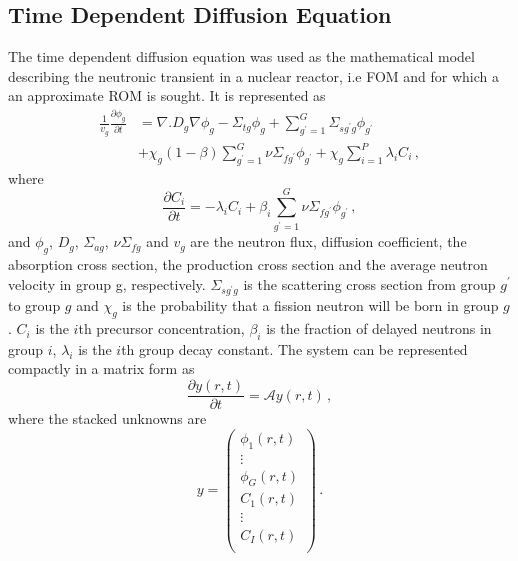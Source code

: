 \documentclass[]{interact}
\theoremstyle{plain}%
\theoremstyle{definition}
\theoremstyle{remark}
\begin{document}
\subsection{Time Dependent Diffusion Equation}
\label{sec:fom}
The time dependent diffusion equation was used as the mathematical model describing the neutronic transient in a nuclear reactor, i.e FOM and for which a an approximate ROM is sought.
It is represented as
\begin{equation}
	\begin{split}
	\frac{1}{v_g} \frac{\partial\phi_g}{\partial t} &= 
	\nabla. D_g\nabla\phi_g - \Sigma_{tg}\phi_g + \sum_{g^\prime=1}^{G}{\Sigma_{sg^\prime g}}\phi_{g^\prime} \\
	&+ \chi_g(1-\beta)\sum_{g^\prime = 1}^{G}\nu\Sigma_{fg^\prime}\phi_{g^\prime}  
	+ \chi_g\sum_{i=1}^{P} \lambda_i C_i \, ,
	\end{split}
	\label{time_diff}
\end{equation}
where 
\begin{equation*}
	\frac{\partial C_i}{\partial t} = -\lambda_i C_i + \beta_i \sum_{g^\prime=1}^{G} \nu\Sigma_{fg^\prime} \phi_{g^\prime} \, ,
\end{equation*}
and $\phi_g$, $D_g$, $\Sigma_{ag}$, $\nu\Sigma_{fg}$ and $v_g$ are the neutron flux, diffusion coefficient, the absorption cross section, the production cross section and the average neutron velocity in group g, respectively. $\Sigma_{sg^\prime g}$ is the scattering cross section from group $g^\prime$ to group $g$ 
and $\chi_g$ is the probability that a fission neutron will be born in group $g$.
$C_i$ is the $i$th precursor concentration, $\beta_i$ is the fraction of delayed neutrons in group $i$, $\lambda_i$ is the $i$th group decay constant.
The system can be represented compactly in a matrix form as 
\begin{equation}
\frac{\partial{y}(r, t)}{\partial{t}} = \mathcal{A}{y}(r, t) \, ,
\end{equation}
where the stacked unknowns are
\begin{equation*}
	{y} = 
	\begin{pmatrix}
	\phi_1(r, t) \\
	\vdots \\
	\phi_G(r, t)  \\
	{C}_1(r, t) \\
	\vdots \\
	{C}_I(r, t) \\
	\end{pmatrix} \, .
\end{equation*}
\end{document}
